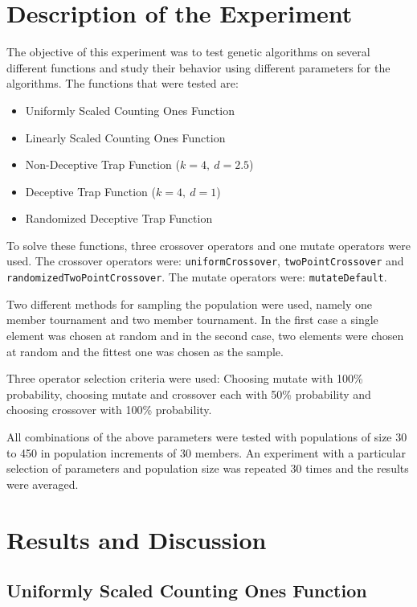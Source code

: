 \documentclass[10pt]{article}
\begin{document}
\section{Description of the Experiment}

The objective of this experiment was to test genetic algorithms on several different functions and study their behavior using different parameters for the algorithms. The functions that were tested are:

\begin{itemize}
\item Uniformly Scaled Counting Ones Function
\item Linearly Scaled Counting Ones Function
\item Non-Deceptive Trap Function ($k=4,\ d=2.5$)
\item Deceptive Trap Function ($k=4,\ d=1$)
\item Randomized Deceptive Trap Function
\end{itemize}

To solve these functions, three crossover operators and one mutate operators were used. The crossover operators were: \verb+uniformCrossover+, \verb+twoPointCrossover+ and \verb+randomizedTwoPointCrossover+. The mutate operators were: \verb+mutateDefault+. 

Two different methods for sampling the population were used, namely one member tournament and two member tournament. In the first case a single element was chosen at random and in the second case, two elements were chosen at random and the fittest one was chosen as the sample.

Three operator selection criteria were used: Choosing mutate with 100\% probability, choosing mutate and crossover each with 50\% probability and choosing crossover with 100\% probability. 

All combinations of the above parameters were tested with populations of size 30 to 450 in population increments of 30 members. An experiment with a particular selection of parameters and population size was repeated 30 times and the results were averaged.
\pagebreak
\section{Results and Discussion}

\subsection{Uniformly Scaled Counting Ones Function}
\end{document}
